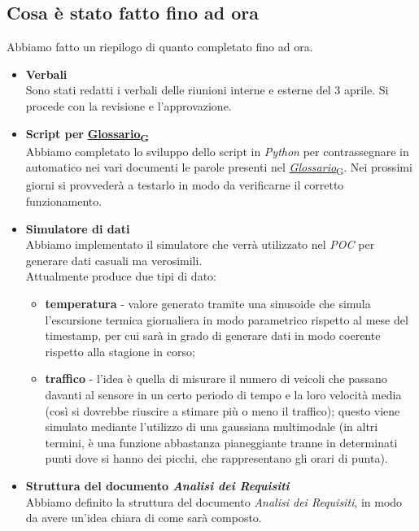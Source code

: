 \documentclass[italian,12pt]{article}
\begin{document}
\subsection{Cosa è stato fatto fino ad ora}
Abbiamo fatto un riepilogo di quanto completato fino ad ora.
\begin{itemize}
	\item \textbf{Verbali} \\
	Sono stati redatti i verbali delle riunioni interne e esterne del 3 aprile. Si procede con la revisione e l'approvazione.
	\item \textbf{Script per} \href{https://7last.github.io/docs/rtb/documentazione-interna/glossario#glossario}{\textbf{Glossario\textsubscript{G}}} \\
	Abbiamo completato lo sviluppo dello script in \textit{Python} per contrassegnare in automatico nei vari documenti le parole presenti nel \href{https://7last.github.io/docs/rtb/documentazione-interna/glossario#glossario}{\textit{Glossario}\textsubscript{G}}. Nei prossimi giorni si provvederà a testarlo in modo da verificarne il corretto funzionamento.
	\item \textbf{Simulatore di dati} \\
	Abbiamo implementato il simulatore che verrà utilizzato nel \textit{POC} per generare dati casuali ma verosimili. \\
	Attualmente produce due tipi di dato:
	\begin{itemize}
		\item \textbf{temperatura} - valore generato tramite una sinusoide che simula l'escursione termica giornaliera in modo parametrico rispetto al mese del timestamp, per cui sarà in grado di generare dati in modo coerente rispetto alla stagione in corso;
		\item \textbf{traffico} - l'idea è quella di misurare il numero di veicoli che passano davanti al sensore in un certo periodo di tempo e la loro velocità media (così si dovrebbe riuscire a stimare più o meno il traffico); questo viene simulato mediante l'utilizzo di una gaussiana multimodale (in altri termini, è una funzione abbastanza pianeggiante tranne in determinati punti dove si hanno dei picchi, che rappresentano gli orari di punta).
	\end{itemize}
	\item \textbf{Struttura del documento \textit{Analisi dei Requisiti}} \\
	Abbiamo definito la struttura del documento \textit{Analisi dei Requisiti}, in modo da avere un'idea chiara di come sarà composto.

\end{itemize}
\end{document}
